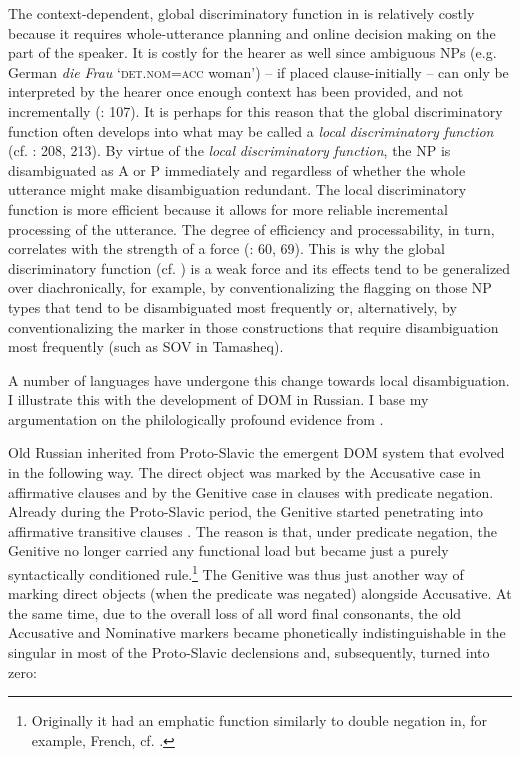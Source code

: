 \documentclass[output=paper]{langsci/langscibook}
\begin{document}
The context-dependent, global discriminatory function in  is relatively costly because it requires whole-utterance planning and online decision making on the part of the speaker. It is costly for the hearer as well since ambiguous NPs (e.g. German \textit{die} \textit{Frau} ‘\textsc{det.nom=acc} woman’) – if placed clause-initially – can only be interpreted by the hearer once enough context has been provided, and not incrementally (\citealt{Bornkessel-SchlesewskySchlesewsky2014}: 107). It is perhaps for this reason that the global discriminatory function often develops into what may be called a \textit{local} \textit{discriminatory} \textit{function} (cf. \citealt{Aissen2003,ZeevatJäger2002,Jäger2004,Malchukov2008}: 208, 213). By virtue of the \textit{local} \textit{discriminatory} \textit{function}, the NP is disambiguated as A or P immediately and regardless of whether the whole utterance might make disambiguation redundant. The local discriminatory function is more efficient because it allows for more reliable incremental processing of the utterance. The degree of efficiency and processability, in turn, correlates with the strength of a force (\citealt{Hawkins2014_CompMot}: 60, 69). This is why the global discriminatory function (cf. ) is a weak force and its effects tend to be generalized over diachronically, for example, by conventionalizing the flagging on those NP types that tend to be disambiguated most frequently or, alternatively, by conventionalizing the marker in those constructions that require disambiguation most frequently (such as SOV in Tamasheq). 

A number of languages have undergone this change towards local disambiguation. I illustrate this with the development of DOM in Russian. I base my argumentation on the philologically profound evidence from \citet{Krysko1994_Russ,Krysko1997_Russ}. 

Old Russian inherited from Proto-Slavic the emergent DOM system that evolved in the following way. The direct object was marked by the Accusative case in affirmative clauses and by the Genitive case in clauses with predicate negation. Already during the Proto-Slavic period, the Genitive started penetrating into affirmative transitive clauses \citep{Klenin1983}. The reason is that, under predicate negation, the Genitive no longer carried any functional load but became just a purely syntactically conditioned rule.\footnote{Originally it had an emphatic function similarly to double negation in, for example, French, cf. \citet{Kuryłowicz1971}.} The Genitive was thus just another way of marking direct objects (when the predicate was negated) alongside Accusative. At the same time, due to the overall loss of all word final consonants, the old Accusative and Nominative markers became phonetically indistinguishable in the singular in most of the Proto-Slavic declensions and, subsequently, turned into zero:
\end{document}
